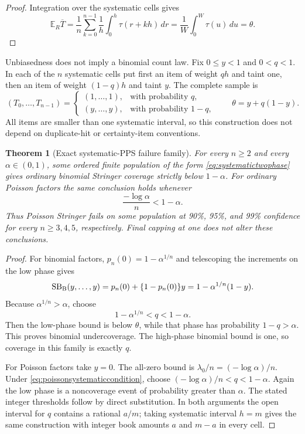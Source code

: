 \documentclass[11pt]{article}
\newtheorem{theorem}{Theorem}
\theoremstyle{definition}
\newcommand{\SB}{\mathrm{SB}}
\newcommand{\E}{\mathbb{E}}
\begin{document}
\begin{proof}
Integration over the systematic cells gives
\[
 \E_R\overline T
 =\frac1n\sum_{k=0}^{n-1}\frac1h
   \int_0^h\tau(r+kh)\,dr
 =\frac1W\int_0^W\tau(u)\,du
 =\theta.
\]
\end{proof}

Unbiasedness does not imply a binomial count law. Fix $0\le y<1$ and
$0<q<1$. In each of the $n$ systematic cells put first an item of weight
$qh$ and taint one, then an item of weight $(1-q)h$ and taint $y$. The
complete sample is
\begin{equation}\label{eq:systematictwophase}
 (T_0,\ldots,T_{n-1})=
 \begin{cases}
 (1,\ldots,1),&\text{with probability }q,\\
 (y,\ldots,y),&\text{with probability }1-q,
 \end{cases}
 \qquad
 \theta=y+q(1-y).
\end{equation}
All items are smaller than one systematic interval, so this construction
does not depend on duplicate-hit or certainty-item conventions.

\begin{theorem}[Exact systematic-PPS failure family]
\label{thm:systematicfailure}
For every $n\ge2$ and every $\alpha\in(0,1)$, some ordered finite population
of the form \eqref{eq:systematictwophase} gives ordinary binomial Stringer
coverage strictly below $1-\alpha$. For ordinary Poisson factors the same
conclusion holds whenever
\begin{equation}\label{eq:poissonsystematiccondition}
 \frac{-\log\alpha}{n}<1-\alpha.
\end{equation}
Thus Poisson Stringer fails on some population at 90\%, 95\%, and 99\%
confidence for every $n\ge3,4,5$, respectively. Final capping at one does
not alter these conclusions.
\end{theorem}

\begin{proof}
For binomial factors, $p_n(0)=1-\alpha^{1/n}$ and telescoping the increments
on the low phase gives
\[
 \SB_{\rm B}(y,\ldots,y)
 =p_n(0)+\{1-p_n(0)\}y
 =1-\alpha^{1/n}(1-y).
\]
Because $\alpha^{1/n}>\alpha$, choose
\[
 1-\alpha^{1/n}<q<1-\alpha.
\]
Then the low-phase bound is below $\theta$, while that phase has probability
$1-q>\alpha$. This proves binomial undercoverage. The high-phase binomial
bound is one, so coverage in this family is exactly $q$.

For Poisson factors take $y=0$. The all-zero bound is
$\lambda_0/n=(-\log\alpha)/n$. Under
\eqref{eq:poissonsystematiccondition}, choose
$(-\log\alpha)/n<q<1-\alpha$. Again the low phase is a noncoverage event of
probability greater than $\alpha$. The stated integer thresholds follow by
direct substitution. In both arguments the open interval for $q$ contains a
rational $a/m$; taking systematic interval $h=m$ gives the same construction
with integer book amounts $a$ and $m-a$ in every cell.
\end{proof}
\end{document}
